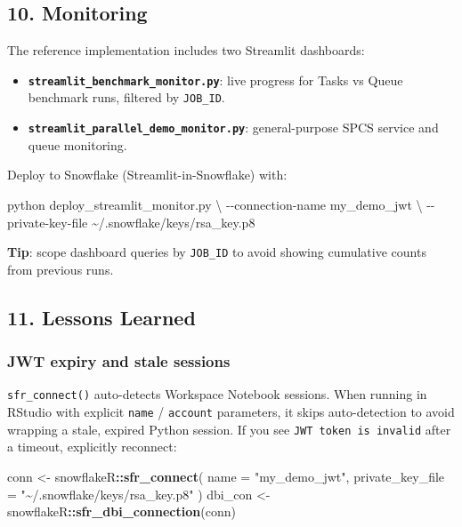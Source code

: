 \documentclass[
]{article}
\newenvironment{Shaded}{\begin{snugshade}}{\end{snugshade}}
\newcommand{\AttributeTok}[1]{\textcolor[rgb]{0.13,0.29,0.53}{#1}}
\newcommand{\DataTypeTok}[1]{\textcolor[rgb]{0.13,0.29,0.53}{#1}}
\newcommand{\ExtensionTok}[1]{#1}
\newcommand{\FunctionTok}[1]{\textcolor[rgb]{0.13,0.29,0.53}{\textbf{#1}}}
\newcommand{\NormalTok}[1]{#1}
\newcommand{\OtherTok}[1]{\textcolor[rgb]{0.56,0.35,0.01}{#1}}
\newcommand{\SpecialCharTok}[1]{\textcolor[rgb]{0.81,0.36,0.00}{\textbf{#1}}}
\newcommand{\StringTok}[1]{\textcolor[rgb]{0.31,0.60,0.02}{#1}}
\providecommand{\tightlist}{%
  \setlength{\itemsep}{0pt}\setlength{\parskip}{0pt}}
\begin{document}
\subsection{10. Monitoring}\label{monitoring}

The reference implementation includes two Streamlit dashboards:

\begin{itemize}
\tightlist
\item
  \textbf{\texttt{streamlit\_benchmark\_monitor.py}}: live progress for
  Tasks vs Queue benchmark runs, filtered by \texttt{JOB\_ID}.
\item
  \textbf{\texttt{streamlit\_parallel\_demo\_monitor.py}}:
  general-purpose SPCS service and queue monitoring.
\end{itemize}

Deploy to Snowflake (Streamlit-in-Snowflake) with:

\begin{Shaded}
\begin{Highlighting}[]
\ExtensionTok{python}\NormalTok{ deploy\_streamlit\_monitor.py }\DataTypeTok{\textbackslash{}}
  \AttributeTok{{-}{-}connection{-}name}\NormalTok{ my\_demo\_jwt }\DataTypeTok{\textbackslash{}}
  \AttributeTok{{-}{-}private{-}key{-}file}\NormalTok{ \textasciitilde{}/.snowflake/keys/rsa\_key.p8}
\end{Highlighting}
\end{Shaded}

\textbf{Tip}: scope dashboard queries by \texttt{JOB\_ID} to avoid
showing cumulative counts from previous runs.

\subsection{11. Lessons Learned}\label{lessons-learned}

\subsubsection{JWT expiry and stale
sessions}\label{jwt-expiry-and-stale-sessions}

\texttt{sfr\_connect()} auto-detects Workspace Notebook sessions. When
running in RStudio with explicit \texttt{name} / \texttt{account}
parameters, it skips auto-detection to avoid wrapping a stale, expired
Python session. If you see \texttt{JWT\ token\ is\ invalid} after a
timeout, explicitly reconnect:

\begin{Shaded}
\begin{Highlighting}[]
\NormalTok{conn }\OtherTok{\textless{}{-}}\NormalTok{ snowflakeR}\SpecialCharTok{::}\FunctionTok{sfr\_connect}\NormalTok{(}
  \AttributeTok{name =} \StringTok{"my\_demo\_jwt"}\NormalTok{,}
  \AttributeTok{private\_key\_file =} \StringTok{"\textasciitilde{}/.snowflake/keys/rsa\_key.p8"}
\NormalTok{)}
\NormalTok{dbi\_con }\OtherTok{\textless{}{-}}\NormalTok{ snowflakeR}\SpecialCharTok{::}\FunctionTok{sfr\_dbi\_connection}\NormalTok{(conn)}
\end{Highlighting}
\end{Shaded}
\end{document}
